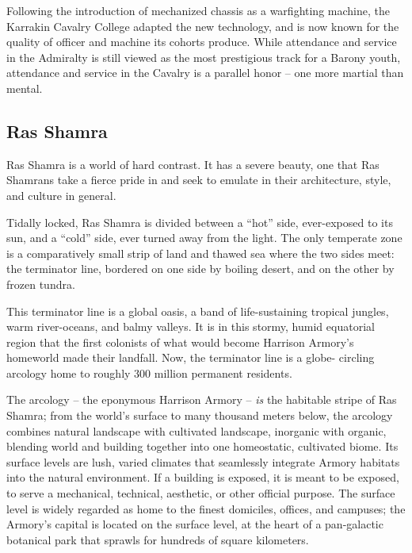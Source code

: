 Following the introduction of mechanized chassis as a warfighting machine, the Karrakin Cavalry
College adapted the new technology, and is now known for the quality of officer and machine its
cohorts produce. While attendance and service in the Admiralty is still viewed as the most
prestigious track for a Barony youth, attendance and service in the Cavalry is a parallel honor --
one more martial than mental.

\subsection{Ras Shamra}

Ras Shamra is a world of hard contrast. It has a severe beauty, one that Ras Shamrans take a
fierce pride in and seek to emulate in their architecture, style, and culture in general.

Tidally locked, Ras Shamra is divided between a ``hot'' side, ever-exposed to its sun, and a ``cold''
side, ever turned away from the light. The only temperate zone is a comparatively small strip of
land and thawed sea where the two sides meet: the terminator line, bordered on one side by
boiling desert, and on the other by frozen tundra.

This terminator line is a global oasis, a band of life-sustaining tropical jungles, warm river-oceans,
and balmy valleys. It is in this stormy, humid equatorial region that the first colonists of what would
become Harrison Armory’s homeworld made their landfall. Now, the terminator line is a globe-
circling arcology home to roughly 300 million permanent residents.

The arcology -- the eponymous Harrison Armory -- \textit{is} the habitable stripe of Ras Shamra; from the
world’s surface to many thousand meters below, the arcology combines natural landscape with
cultivated landscape, inorganic with organic, blending world and building together into one
homeostatic, cultivated biome. Its surface levels are lush, varied climates that seamlessly
integrate Armory habitats into the natural environment. If a building is exposed, it is meant to be
exposed, to serve a mechanical, technical, aesthetic, or other official purpose. The surface level is
widely regarded as home to the finest domiciles, offices, and campuses; the Armory’s capital is
located on the surface level, at the heart of a pan-galactic botanical park that sprawls for
hundreds of square kilometers.


